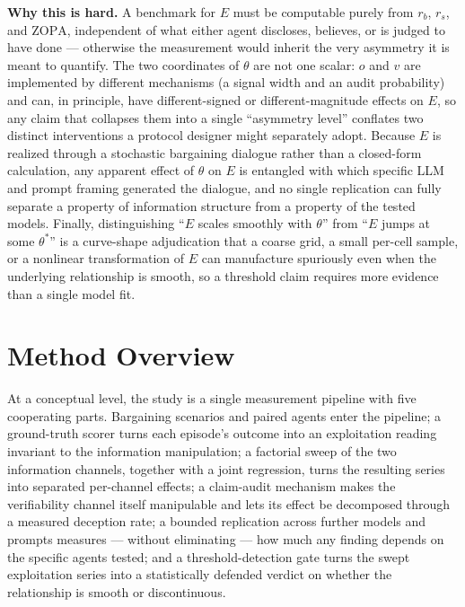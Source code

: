\documentclass[11pt]{article}
\begin{document}
\noindent\textbf{Why this is hard.} A benchmark for $E$ must be computable purely from $r_b$, $r_s$, and $\mathrm{ZOPA}$, independent of what either agent discloses, believes, or is judged to have done --- otherwise the measurement would inherit the very asymmetry it is meant to quantify. The two coordinates of $\theta$ are not one scalar: $o$ and $v$ are implemented by different mechanisms (a signal width and an audit probability) and can, in principle, have different-signed or different-magnitude effects on $E$, so any claim that collapses them into a single ``asymmetry level'' conflates two distinct interventions a protocol designer might separately adopt. Because $E$ is realized through a stochastic bargaining dialogue rather than a closed-form calculation, any apparent effect of $\theta$ on $E$ is entangled with which specific LLM and prompt framing generated the dialogue, and no single replication can fully separate a property of information structure from a property of the tested models. Finally, distinguishing ``$E$ scales smoothly with $\theta$'' from ``$E$ jumps at some $\theta^*$'' is a curve-shape adjudication that a coarse grid, a small per-cell sample, or a nonlinear transformation of $E$ can manufacture spuriously even when the underlying relationship is smooth, so a threshold claim requires more evidence than a single model fit.

\section{Method Overview}

At a conceptual level, the study is a single measurement pipeline with five cooperating parts. Bargaining scenarios and paired agents enter the pipeline; a ground-truth scorer turns each episode's outcome into an exploitation reading invariant to the information manipulation; a factorial sweep of the two information channels, together with a joint regression, turns the resulting series into separated per-channel effects; a claim-audit mechanism makes the verifiability channel itself manipulable and lets its effect be decomposed through a measured deception rate; a bounded replication across further models and prompts measures --- without eliminating --- how much any finding depends on the specific agents tested; and a threshold-detection gate turns the swept exploitation series into a statistically defended verdict on whether the relationship is smooth or discontinuous.
\end{document}
